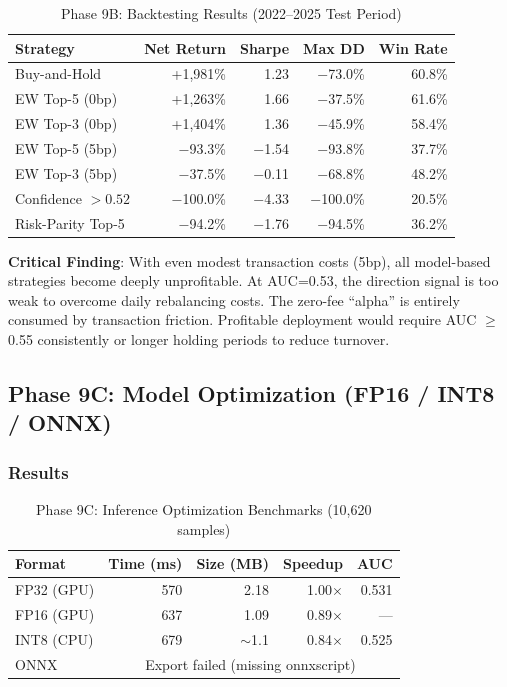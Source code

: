 \documentclass[12pt,a4paper]{article}
\begin{document}
\begin{table}[H]
\centering
\caption{Phase 9B: Backtesting Results (2022--2025 Test Period)}
\begin{tabular}{lrrrr}
\toprule
\textbf{Strategy} & \textbf{Net Return} & \textbf{Sharpe} & \textbf{Max DD} & \textbf{Win Rate} \\
\midrule
Buy-and-Hold           & +1,981\% & 1.23  & $-$73.0\% & 60.8\% \\
EW Top-5 (0bp)         & +1,263\% & 1.66  & $-$37.5\% & 61.6\% \\
EW Top-3 (0bp)         & +1,404\% & 1.36  & $-$45.9\% & 58.4\% \\
\midrule
EW Top-5 (5bp)         & $-$93.3\% & $-$1.54 & $-$93.8\% & 37.7\% \\
EW Top-3 (5bp)         & $-$37.5\% & $-$0.11 & $-$68.8\% & 48.2\% \\
Confidence $> 0.52$    & $-$100.0\% & $-$4.33 & $-$100.0\% & 20.5\% \\
Risk-Parity Top-5      & $-$94.2\% & $-$1.76 & $-$94.5\% & 36.2\% \\
\bottomrule
\end{tabular}
\end{table}

\noindent\textbf{Critical Finding}: With even modest transaction costs (5bp), all model-based
strategies become deeply unprofitable. At AUC=0.53, the direction signal is too weak to
overcome daily rebalancing costs. The zero-fee ``alpha'' is entirely consumed by transaction
friction. Profitable deployment would require AUC $\geq$ 0.55 consistently or longer holding
periods to reduce turnover.

\subsection{Phase 9C: Model Optimization (FP16 / INT8 / ONNX)}

\subsubsection{Results}

\begin{table}[H]
\centering
\caption{Phase 9C: Inference Optimization Benchmarks (10,620 samples)}
\begin{tabular}{lrrrr}
\toprule
\textbf{Format} & \textbf{Time (ms)} & \textbf{Size (MB)} & \textbf{Speedup} & \textbf{AUC} \\
\midrule
FP32 (GPU) & 570 & 2.18 & 1.00$\times$ & 0.531 \\
FP16 (GPU) & 637 & 1.09 & 0.89$\times$ & --- \\
INT8 (CPU) & 679 & $\sim$1.1 & 0.84$\times$ & 0.525 \\
ONNX       & \multicolumn{4}{c}{Export failed (missing onnxscript)} \\
\bottomrule
\end{tabular}
\end{table}
\end{document}
